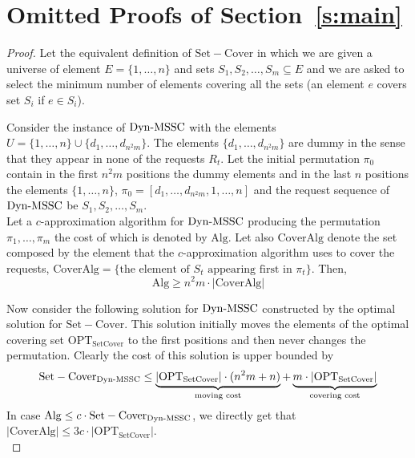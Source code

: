 \section{Omitted Proofs of Section~\ref{s:main}}\label{s:appendix_first}

\begin{proof}
Let the equivalent definition of $\mathrm{Set-Cover}$ in which we are given a universe of element $E = \{1,\ldots,n\}$ and sets $S_1,S_2,\ldots,S_m \subseteq E$ and we are asked to select the minimum number of elements covering all the sets (an element $e$ covers set $S_i$ if $e \in S_i$).

Consider the instance of $\mathrm{Dyn}\text{-}\mathrm{MSSC}$ with the elements $U= \{1,\ldots,n\} \cup \{d_1,\ldots,d_{n^2m}\}$. The elements $\{d_1,\ldots,d_{n^2m}\}$
are dummy in the sense that
they appear in none of the requests $R_t$. Let the initial permutation $\pi_0$ contain in the first $n^2m$ positions the dummy elements and in the last $n$ positions the elements $\{1,\ldots,n\}$, $\pi_0 = [d_1,\ldots,d_{n^2m},1,\ldots,n]$ and the request sequence of 
$\mathrm{Dyn}\text{-}\mathrm{MSSC}$ be $S_1,S_2,\ldots,S_m$.\\

Let a $c$-approximation algorithm for $\mathrm{Dyn}\text{-}\mathrm{MSSC}$ producing the permutation $\pi_1,\ldots,\pi_m$ the cost of which is denoted by $\mathrm{Alg}$. Let also $\mathrm{CoverAlg}$ denote the set composed by the element that the $c$-approximation algorithm uses to cover the requests, $\mathrm{CoverAlg} = \{\text{the element of }S_t\text{ appearing first in }\pi_t\}$. Then,
$$\mathrm{Alg} \geq n^2 m \cdot |\mathrm{CoverAlg}|$$


Now consider the following solution 
for $\mathrm{Dyn}\text{-}\mathrm{MSSC}$ constructed by the optimal solution for $\mathrm{Set-Cover}$. This solution initially moves the elements of the optimal covering set
$\mathrm{OPT}_\mathrm{SetCover}$ to the first positions and then never changes the permutation. Clearly the cost of this solution is upper bounded by
$$\mathrm{Set-Cover}_{\mathrm{Dyn}\text{-}\mathrm{MSSC}} \leq \underbrace{|\mathrm{OPT}_\mathrm{SetCover}| \cdot (n^2m + n)}_{\text{moving cost}} + \underbrace{m\cdot |\mathrm{OPT}_\mathrm{SetCover}|}_{\text{covering cost}}  $$
\noindent In case $\mathrm{Alg} \leq c \cdot \mathrm{Set-Cover}_{\mathrm{Dyn}\text{-}\mathrm{MSSC}}$, we directly get that $|\mathrm{CoverAlg}| \leq 3c \cdot |\mathrm{OPT}_\mathrm{SetCover}|$.\\


\end{proof}
